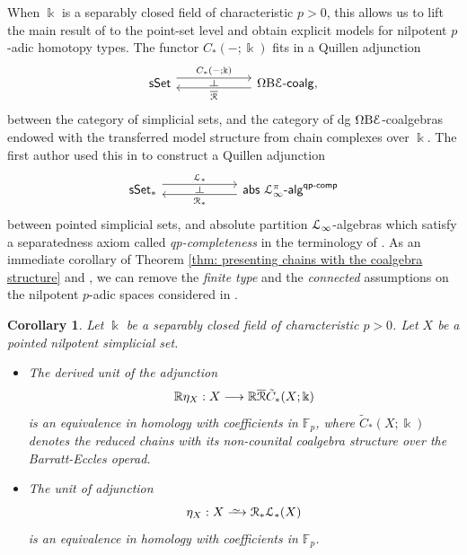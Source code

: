 \documentclass[a4paper,12pt]{amsart}
\renewcommand{\mathcal}{\EuScript}
\theoremstyle{plain}
\newtheorem{corollary}[theorem]{Corollary}%
\theoremstyle{definition}
\theoremstyle{remark}
\newcommand{\qi}{\xrightarrow{ \,\smash{\raisebox{-0.65ex}{\ensuremath{\scriptstyle\sim}}}\,}}
\newcommand{\kk}{\Bbbk}
\begin{document}
When $\kk$ is a separably closed field of characteristic $p > 0$, this allows us to lift the main result of \cite{bachmann2024} to the point-set level and obtain explicit models for nilpotent $p$-adic homotopy types. The functor $C_*(-;\kk)$ fits in a Quillen adjunction 
\[
\begin{tikzcd}[column sep=5pc,row sep=3pc]
         \mathsf{sSet} \arrow[r, shift left=1.1ex, "C_*(-;\kk)"{name=F}] &\Omega \mathrm{B} \mathcal{E}\text{-}\mathsf{coalg}, \arrow[l, shift left=.75ex, "\overline{\mathcal{R}}"{name=U}]
            \arrow[phantom, from=F, to=U, , "\dashv" rotate=-90]
\end{tikzcd}
\]
between the category of simplicial sets, and the category of dg $\Omega\mathrm{B}\mathcal{E}$-coalgebras endowed with the transferred model structure from chain complexes over $\kk$. The first author used this in \cite{lucio2024higherlietheorypositive} to construct a Quillen adjunction 
\[
\begin{tikzcd}[column sep=5pc,row sep=3pc]
          \mathsf{sSet}_* \arrow[r, shift left=1.1ex, "\mathcal{L}_*"{name=A}]
          &\mathsf{abs}~\mathcal{L}_\infty^\pi\text{-}\mathsf{alg}^{\mathsf{qp}\text{-}\mathsf{comp}} \arrow[l, shift left=.75ex, "\mathcal{R}_*"{name=B}]
           \arrow[phantom, from=A, to=B, , "\dashv" rotate=-90]
\end{tikzcd}
\]
between pointed simplicial sets, and absolute partition $\mathcal{L}_\infty$-algebras which satisfy a separatedness axiom called \textit{qp-completeness} in the terminology of \cite{premierpapier}. As an immediate corollary of Theorem \ref{thm: presenting chains with the coalgebra structure} and \cite[Theorem 1.2]{bachmann2024}, we can remove the \textit{finite type} and the \textit{connected} assumptions on the nilpotent $p$-adic spaces considered in \cite{lucio2024higherlietheorypositive}. 

\begin{corollary}
Let $\kk$ be a separably closed field of characteristic $p > 0$. Let $X$ be a pointed nilpotent simplicial set.
\begin{itemize}
\item[(1)] The derived unit of the adjunction 
\[
\mathbb{R}\eta_X: X \longrightarrow \mathbb{R}\overline{\mathcal{R}}\tilde{C}_*(X;\kk)
\]
is an equivalence in homology with coefficients in $\mathbb{F}_p$, where $\tilde{C}_*(X;\kk)$ denotes the \textit{reduced} chains with its non-counital coalgebra structure over the Barratt-Eccles operad.
\item[(2)] The unit of adjunction
\[
\eta_X: X \qi \mathcal{R}_*\mathcal{L}_*(X) 
\]
is an equivalence in homology with coefficients in $\mathbb{F}_p$.
\end{itemize}
\end{corollary}
\end{document}
